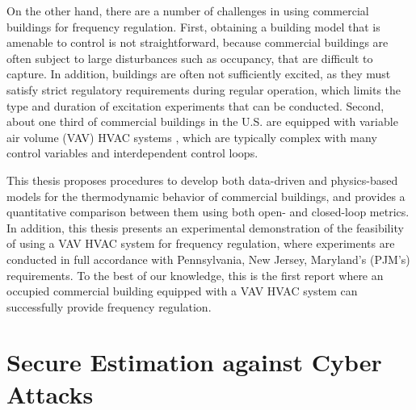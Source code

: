 \documentclass[../thesis.tex]{subfiles}
\begin{document}
On the other hand, there are a number of challenges in using commercial buildings for frequency regulation. 
First, obtaining a building model that is amenable to control is not straightforward, because commercial buildings are often subject to large disturbances such as occupancy, that are difficult to capture. 
In addition, buildings are often not sufficiently excited, as they must satisfy strict regulatory requirements during regular operation, which limits the type and duration of excitation experiments that can be conducted.
Second, about one third of commercial buildings in the U.S. are equipped with variable air volume (VAV) HVAC systems \cite{Hao:2012demandresponse}, which are typically complex with many control variables and interdependent control loops.

This thesis proposes procedures to develop both data-driven and physics-based models for the thermodynamic behavior of commercial buildings, and provides a quantitative comparison between them using both open- and closed-loop metrics. 
In addition, this thesis presents an experimental demonstration of the feasibility of using a VAV HVAC system for frequency regulation, where experiments are conducted in full accordance with Pennsylvania, New Jersey, Maryland's (PJM's) requirements. %
To the best of our knowledge, this is the first report where an occupied commercial building equipped with a VAV HVAC system can successfully provide frequency regulation.






\section{Secure Estimation against Cyber Attacks}
\end{document}
